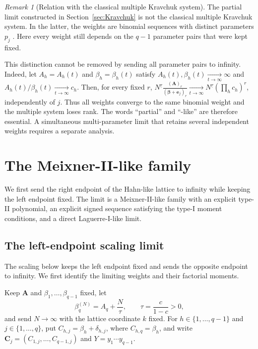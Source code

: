\documentclass[10pt]{amsart}
\newcommand{\A}{\boldsymbol A}
\newcommand{\bbeta}{\boldsymbol\beta}
\newcommand{\ee}{\boldsymbol e}
\newcommand{\fall}[2]{#1^{\underline{#2}}}
\theoremstyle{plain}
\theoremstyle{definition}
\theoremstyle{remark}
\newtheorem{remark}[theorem]{Remark}
\begin{document}
\begin{remark}[Relation with the classical multiple Kravchuk system]
The partial limit constructed in Section~\ref{sec:Kravchuk} is not the
classical multiple Kravchuk system. In the latter, the weights are binomial
sequences with distinct parameters \(p_j\)
\cite{ArvesuCoussementVanAssche2003,
BranquinhoDiazFoulquieManasWolfs2024Discrete}. Here every weight still
depends on the \(q-1\) parameter pairs that were kept fixed.

This distinction cannot be removed by sending all parameter pairs to
infinity.
Indeed, let \(A_h=A_h(t)\) and \(\beta_h=\beta_h(t)\) satisfy
\(A_h(t),\beta_h(t)\xrightarrow[t\to\infty]{}\infty\) and
\(A_h(t)/\beta_h(t)\xrightarrow[t\to\infty]{}c_h\). Then, for every
fixed \(r\),
\(\fall{N}{r}\frac{(\A)_r}
{(\bbeta+\ee_j)_r}
\xrightarrow[t\to\infty]{}
\fall{N}{r}\left(\prod_hc_h\right)^r\),
independently of \(j\). Thus all weights converge to the same binomial weight
and the multiple system loses rank. The words \enquote{partial} and
\enquote{-like} are therefore essential.  A simultaneous multi-parameter
limit that retains several independent weights requires a separate
analysis.
\end{remark}


\section{The Meixner-II-like family}
\label{sec:MII}

We first send the right endpoint of the Hahn-like lattice to infinity while
keeping the left endpoint fixed. The limit is a Meixner-II-like family with
an explicit type-II polynomial, an explicit signed sequence satisfying the
type-I moment conditions, and a direct Laguerre-I-like limit.

\subsection{The left-endpoint scaling limit}

The scaling below keeps the left endpoint fixed and sends the opposite
endpoint to infinity. We first identify the limiting weights and their
factorial moments.

Keep \(\A\) and \(\beta_1,\ldots,\beta_{q-1}\) fixed, let
\begin{equation}
 \beta_q^{(N)}=A_q+\frac{N}{\tau},
 \qquad
 \tau=\frac{c}{1-c}>0,
 \label{eq:MII-scaling}
\end{equation}
and send \(N\to\infty\) with the lattice coordinate \(k\) fixed. For
\(h\in\{1,\ldots,q-1\}\) and \(j\in\{1,\ldots,q\}\), put
\(C_{h,j}=\beta_h+\delta_{h,j}\),
where \(C_{h,q}=\beta_h\), and write
\(\boldsymbol C_j=(C_{1,j},\ldots,C_{q-1,j})\) and
\(Y=y_1\cdots y_{q-1}\).
\end{document}
